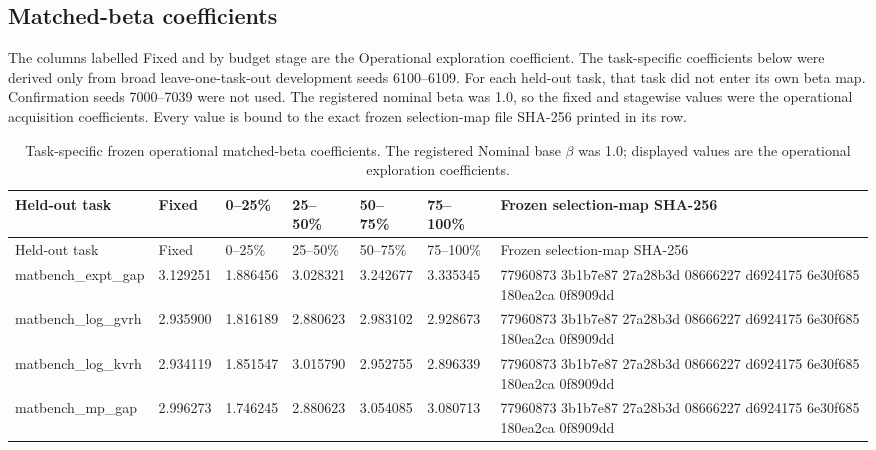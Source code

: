 \documentclass[10pt]{article}
\begin{document}
\begin{landscape}
\section{Matched-beta coefficients}
The columns labelled Fixed and by budget stage are the Operational exploration coefficient. The task-specific coefficients below were derived only from broad
leave-one-task-out development seeds 6100--6109. For each held-out task, that
task did not enter its own beta map. Confirmation seeds 7000--7039 were not
used. The registered nominal beta was 1.0, so the fixed and stagewise values
were the operational acquisition coefficients. Every value is bound to the
exact frozen selection-map file SHA-256 printed in its row.


\begingroup\scriptsize
\begin{longtable}{L{1.45in}L{.85in}L{.85in}L{.85in}L{.85in}L{.85in}L{2.45in}}
\caption{Task-specific frozen operational matched-beta coefficients. The registered Nominal base $\beta$ was 1.0; displayed values are the operational exploration coefficients.}\\
\toprule
Held-out task & Fixed & 0--25\% & 25--50\% & 50--75\% & 75--100\% & Frozen selection-map SHA-256\\
\midrule
\endfirsthead
\toprule
Held-out task & Fixed & 0--25\% & 25--50\% & 50--75\% & 75--100\% & Frozen selection-map SHA-256\\
\midrule
\endhead
matbench\_\allowbreak{}expt\_\allowbreak{}gap & 3.129251 & 1.886456 & 3.028321 & 3.242677 & 3.335345 & 77960873 3b1b7e87 27a28b3d 08666227 d6924175 6e30f685 180ea2ca 0f8909dd\\
matbench\_\allowbreak{}log\_\allowbreak{}gvrh & 2.935900 & 1.816189 & 2.880623 & 2.983102 & 2.928673 & 77960873 3b1b7e87 27a28b3d 08666227 d6924175 6e30f685 180ea2ca 0f8909dd\\
matbench\_\allowbreak{}log\_\allowbreak{}kvrh & 2.934119 & 1.851547 & 3.015790 & 2.952755 & 2.896339 & 77960873 3b1b7e87 27a28b3d 08666227 d6924175 6e30f685 180ea2ca 0f8909dd\\
matbench\_\allowbreak{}mp\_\allowbreak{}gap & 2.996273 & 1.746245 & 2.880623 & 3.054085 & 3.080713 & 77960873 3b1b7e87 27a28b3d 08666227 d6924175 6e30f685 180ea2ca 0f8909dd\\
\bottomrule
\end{longtable}
\endgroup

\end{landscape}
\end{document}
